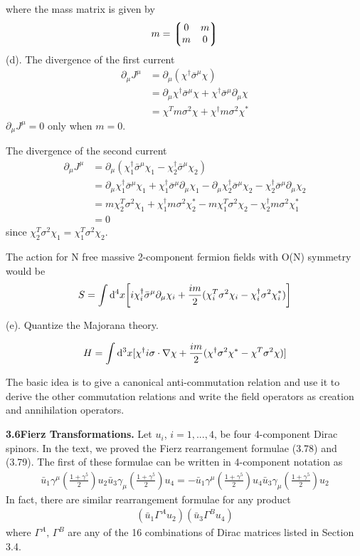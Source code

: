 \documentclass{article}
\newcommand{\s}{\sigma}
\begin{document}
where the mass matrix is given by
\begin{align*}
  m=\Pmqty{0&m\\m&0}
\end{align*}
(d). The divergence of the first current
\begin{align*}
  \partial_{\mu}J^{\mu}&=\partial_{\mu}(\chi^{\dagger}\bar{\sigma}^{\mu}\chi)\\
  &=\partial_{\mu}\chi^{\dagger}\bar{\sigma}^{\mu}\chi+\chi^{\dagger}\bar{\sigma}^{\mu}\partial_{\mu}\chi\\
  &=\chi^T m\sigma^2\chi+\chi^{\dagger}m\sigma^2\chi^*
\end{align*}
$\partial_{\mu}J^{\mu}=0$ only when $m=0$.

The divergence of the second current
\begin{align*}
  \partial_{\mu} J^{\mu}&=\partial_{\mu}(\chi_1^{\dagger}\bar{\sigma}^{\mu}\chi_1-\chi_2^{\dagger}\bar{\sigma}^{\mu}\chi_2)\\
  &=\partial_{\mu}\chi_1^{\dagger}\bar{\sigma}^{\mu}\chi_1+\chi_1^{\dagger}\bar{\sigma}^{\mu}\partial_{\mu}\chi_1-\partial_{\mu}\chi_2^{\dagger}\bar{\sigma}^{\mu}\chi_2-\chi_2^{\dagger}\bar{\sigma}^{\mu}\partial_{\mu}\chi_2\\
  &=m\chi_2^T\sigma^2\chi_1+\chi_1^{\dagger}m\sigma^2\chi_2^*-m\chi_1^T\sigma^2\chi_2-\chi_2^{\dagger}m\sigma^2\chi_1^*\\
  &=0
\end{align*}
since $\chi^T_2\sigma^2\chi_1=\chi^T_1\sigma^2\chi_2$.

The action for N free massive 2-component fermion fields with O(N) symmetry would be
\begin{align*}
  S=\int\dd^4x \bqty{i\chi^{\dagger}_i\bar{\sigma}^{\mu}\partial_{\mu}\chi_i+\frac{im}{2}(\chi^T_i\sigma^2\chi_i-\chi_i^{\dagger}\sigma^2\chi^*_i)}
\end{align*}

(e). Quantize the Majorana theory.

$$H=\int\dd^3x[\chi^{\dagger}i\vb{\sigma}\cdot\nabla\chi+\frac{im}{2}(\chi^{\dagger}\s^2\chi^*-\chi^T\s^2\chi)]$$

The basic idea is to give a canonical anti-commutation relation and use it to derive the other commutation relations and write the field operators as creation and annihilation operators.


{\bf3.6\quad Fierz Transformations.} Let $u_i$, $i=1,...,4$, be four 4-component Dirac spinors. In the text, we proved the Fierz rearrangement formulae (3.78) and (3.79). The first of these formulae can be written in 4-component notation as
\begin{align}
  \bar{u}_1\gamma^{\mu}(\frac{1+\gamma^5}{2})u_2\bar{u}_3\gamma_{\mu}(\frac{1+\gamma^5}{2})u_4=-\bar{u}_1\gamma^{\mu}(\frac{1+\gamma^5}{2})u_4\bar u_3\gamma_{\mu}(\frac{1+\gamma^5}{2})u_2
\end{align}
In fact, there are similar rearrangement formulae for any product
\begin{align}
  (\bar{u}_1\Gamma^Au_2)(\bar{u}_3\Gamma^Bu_4)
\end{align}
where $\Gamma^A, \,\Gamma^B$ are any of the 16 combinations of Dirac matrices listed in Section 3.4.
\end{document}
